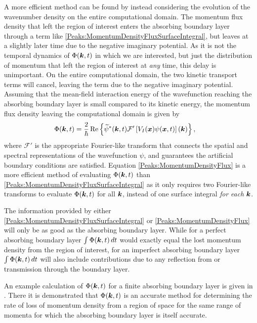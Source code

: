 A more efficient method can be found by instead considering the evolution of the wavenumber density on the entire computational domain. The momentum flux density that left the region of interest enters the absorbing boundary layer through a term like \eqref{Peaks:MomentumDensityFluxSurfaceIntegral}, but leaves at a slightly later time due to the negative imaginary potential. As it is not the temporal dynamics of $\Phi(\bm{k}, t)$ in which we are interested, but just the distribution of momentum that left the region of interest at \emph{any} time, this delay is unimportant. On the entire computational domain, the two kinetic transport terms will cancel, leaving the term due to the negative imaginary potential. Assuming that the mean-field interaction energy of the wavefunction reaching the absorbing boundary layer is small compared to its kinetic energy, the momentum flux density leaving the computational domain is given by
\begin{align}
    \label{Peaks:MomentumDensityFlux}
    \Phi(\vect{k}, t)&=\frac{2}{\hbar} \Re \left\{ \widetilde{\psi}^*(\vect{k}, t) \mathcal{F}'\left[ V_I(\vect{x}) \psi(\vect{x}, t)\right](\vect{k}) \right\},
\end{align}
where $\mathcal{F}'$ is the appropriate Fourier-like transform that connects the spatial and spectral representations of the wavefunction $\psi$, and guarantees the artificial boundary conditions are satisfied. Equation \eqref{Peaks:MomentumDensityFlux} is a more efficient method of evaluating $\Phi(\bm{k}, t)$ than \eqref{Peaks:MomentumDensityFluxSurfaceIntegral} as it only requires two Fourier-like transforms to evaluate $\Phi(\bm{k}, t)$ for all $\bm{k}$, instead of one surface integral \emph{for each} $\bm{k}$.

The information provided by either \eqref{Peaks:MomentumDensityFluxSurfaceIntegral} or \eqref{Peaks:MomentumDensityFlux} will only be as good as the absorbing boundary layer. While for a perfect absorbing boundary layer $\int \Phi(\bm{k}, t)\, dt$ would exactly equal the lost momentum density from the region of interest, for an imperfect absorbing boundary layer $\int \Phi(\bm{k}, t)\, dt$ will also include contributions due to any reflection from or transmission through the boundary layer. 

An example calculation of $\Phi(\bm{k}, t)$ for a finite absorbing boundary layer is given in . There it is demonstrated that $\Phi(\bm{k}, t)$ is an accurate method for determining the rate of loss of momentum density from a region of space for the same range of momenta for which the absorbing boundary layer is itself accurate.

